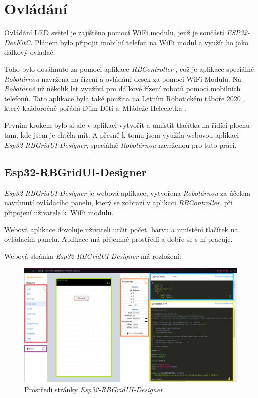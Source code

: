 \chapter{Ovládání}
Ovládání LED světel je zajištěno pomocí WiFi modulu, jenž je součástí \textit{ESP32-DevKitC}. Plánem bylo připojit mobilní telefon na WiFi modul a využít ho jako dálkový ovladač. 

Toho bylo dosáhnuto za pomoci aplikace \textit{RBController} \cite{RBControler}, což je aplikace speciálně \textit{Robotárnou} \cite{robotarna} navržena na řízení a ovládání desek za pomoci WiFi Modulu. Na \textit{Robotárně} už několik let využívá pro dálkové řízení robotů pomocí mobilních telefonů. Tato aplikace byla také použita na Letním Robotickém táboře 2020 \cite{tabor}, který každoročně pořádá Dům Dětí a~Mládeže Helceletka \cite{helceletka}.

Prvním krokem bylo si ale v aplikaci vytvořit a umístit tlačítka na řídící plochu tam, kde jsem je chtěla mít. A přesně k tomu jsem využila webovou aplikaci \textit{Esp32-RBGridUI-Designer}, speciálně \textit{Robotárnou} navrženou pro tuto práci.


\section{Esp32-RBGridUI-Designer} 
\textit{Esp32-RBGridUI-Designer} \cite{designer} je webová aplikace, vytvořena \textit{Robotárnou} za účelem navrhnutí ovládacího panelu, který se zobrazí v aplikaci \textit{RBController}, při připojení uživatele k~WiFi modulu. 

Webová aplikace dovoluje uživateli určit počet, barvu a umístění tlačítek na ovládacím panelu. Aplikace má příjemné prostředí a dobře se s ní pracuje. 

Webová stránka {\em Esp32-RBGridUI-Designer} má rozložení: 


\begin{figure}[htbp]
	\centering
	\includegraphics[width=1\textwidth]{img/03ovl/Esp32-RBGridUI-Designer.png}
	\caption{Prostředí stránky {\em Esp32-RBGridUI-Designer}}
\end{figure}

